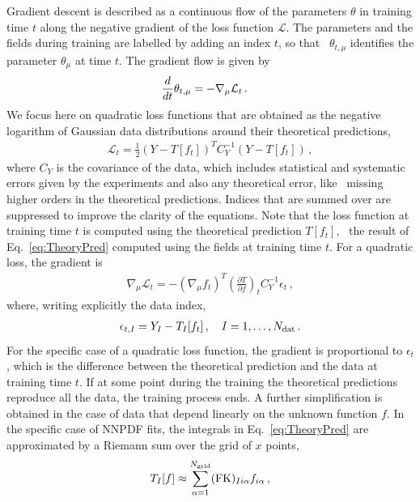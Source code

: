 \documentclass[11pt]{article}
\begin{document}
Gradient descent is described as a continuous flow of the parameters $\theta$ in training time $t$ 
along the negative gradient of the loss function $\mathcal{L}$. The parameters and the fields during
training are labelled by adding an index $t$, so that \eg\ $\theta_{t,\mu}$ identifies the parameter
$\theta_\mu$ at time $t$. 
The gradient flow is given by 
\begin{align}
    \label{eq:GradientFlowDef}
    \frac{d}{dt} &\theta_{t,\mu} = -\nabla_\mu \mathcal{L}_t\, .
\end{align}
We focus here on quadratic loss functions that are obtained as the negative logarithm of Gaussian 
data distributions around their theoretical predictions, 
\begin{align}
    \label{eq:QuadLoss}
    \mathcal{L}_t = \frac12 \left(Y - T[f_t]\right)^T C_Y^{-1} \left(Y - T[f_t]\right)\, ,
\end{align}
where $C_Y$ is the covariance of the data, which includes statistical and systematic errors given by 
the experiments and also any theoretical error, like \eg\ missing higher orders in the theoretical 
predictions. Indices that are summed over are suppressed to improve the clarity of the equations. 
Note that the loss function at training time $t$ is computed using the theoretical prediction $T[f_t]$,
\ie\ the result of Eq.~\eqref{eq:TheoryPred} computed using the fields at training time $t$. For a quadratic 
loss, the gradient is
\begin{align}
    \nabla_\mu \mathcal{L}_t = - \left(\nabla_\mu f_t\right)^T \left(\frac{\partial T}{\partial f}\right)_t
      C_Y^{-1} \epsilon_t\, , 
\end{align}
where, writing explicitly the data index, 
\begin{align}
    \label{eq:EpsDef}
    \epsilon_{t,I} = Y_I - T_I[f_t]\, , \quad I=1, \ldots, N_{\mathrm{dat}}\, .
\end{align}
For the specific case of a quadratic loss function, the gradient is proportional to $\epsilon_t$, which 
is the difference between the theoretical prediction and the data at training time $t$. If at some point 
during the training the theoretical predictions reproduce all the data, the training process ends. 
A further simplification is obtained in the case of data that depend linearly on the unknown function $f$. 
In the specific case of NNPDF fits, the integrals in Eq.~\eqref{eq:TheoryPred} are approximated by 
a Riemann sum over the grid of $x$ points, 
\begin{align}
    \label{eq:FKTabDef}
    T_I[f] \approx \sum_{\alpha=1}^{N_{\mathrm{grid}}} (\mathrm{FK})_{Ii\alpha} f_{i\alpha}\, ,
\end{align}
\end{document}
